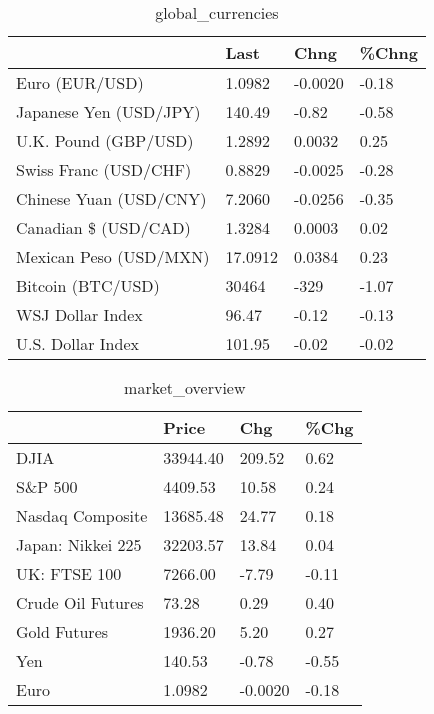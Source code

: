 \documentclass{article}%
\begin{document}
%


\begin{table}[htbp]%
\caption{global\_currencies}%
\centering%
\begin{adjustbox}{width=1\textwidth}%
\begin{tabular}{llll}
\toprule
                       &    Last &    Chng & \%Chng \\
\midrule
        Euro (EUR/USD) &  1.0982 & -0.0020 & -0.18 \\
Japanese Yen (USD/JPY) &  140.49 &   -0.82 & -0.58 \\
  U.K. Pound (GBP/USD) &  1.2892 &  0.0032 &  0.25 \\
 Swiss Franc (USD/CHF) &  0.8829 & -0.0025 & -0.28 \\
Chinese Yuan (USD/CNY) &  7.2060 & -0.0256 & -0.35 \\
  Canadian \$ (USD/CAD) &  1.3284 &  0.0003 &  0.02 \\
Mexican Peso (USD/MXN) & 17.0912 &  0.0384 &  0.23 \\
     Bitcoin (BTC/USD) &   30464 &    -329 & -1.07 \\
      WSJ Dollar Index &   96.47 &   -0.12 & -0.13 \\
     U.S. Dollar Index &  101.95 &   -0.02 & -0.02 \\
\bottomrule
\end{tabular}
%
\end{adjustbox}%
\end{table}

%


\begin{table}[htbp]%
\caption{market\_overview}%
\centering%
\begin{adjustbox}{width=1\textwidth}%
\begin{tabular}{llll}
\toprule
                  &    Price &     Chg &  \%Chg \\
\midrule
             DJIA & 33944.40 &  209.52 &  0.62 \\
          S\&P 500 &  4409.53 &   10.58 &  0.24 \\
 Nasdaq Composite & 13685.48 &   24.77 &  0.18 \\
Japan: Nikkei 225 & 32203.57 &   13.84 &  0.04 \\
     UK: FTSE 100 &  7266.00 &   -7.79 & -0.11 \\
Crude Oil Futures &    73.28 &    0.29 &  0.40 \\
     Gold Futures &  1936.20 &    5.20 &  0.27 \\
              Yen &   140.53 &   -0.78 & -0.55 \\
             Euro &   1.0982 & -0.0020 & -0.18 \\
\bottomrule
\end{tabular}
%
\end{adjustbox}%
\end{table}

%
\end{document}
